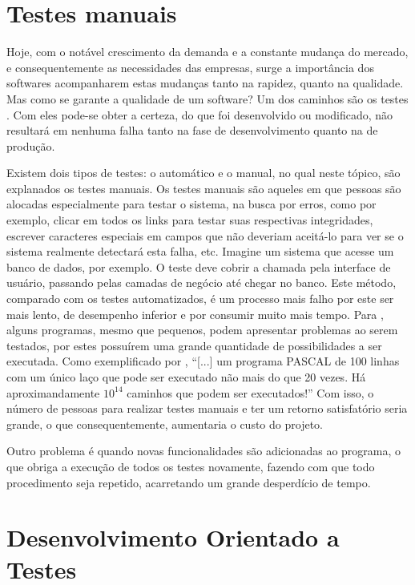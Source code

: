 \section{Testes manuais}

Hoje, com o notável crescimento da demanda e a constante mudança do mercado, e consequentemente as necessidades das empresas, surge a importância dos softwares acompanharem estas mudanças tanto na rapidez, quanto na qualidade. Mas como se garante a qualidade de um software? Um dos caminhos são os testes \cite{PRESSMAN}. Com eles pode-se obter a certeza, do que foi desenvolvido ou modificado, não resultará em nenhuma falha tanto na fase de desenvolvimento quanto na de produção.

Existem dois tipos de testes: o automático e o manual, no qual neste tópico, são explanados os testes manuais. Os testes manuais são aqueles em que pessoas são alocadas especialmente para testar o sistema, na busca por erros, como por exemplo, clicar em todos os links para testar suas respectivas integridades, escrever caracteres especiais em campos que não deveriam aceitá-lo para ver se o sistema realmente detectará esta falha, etc. Imagine um sistema que acesse um banco de dados, por exemplo. O teste deve cobrir a chamada pela interface de usuário, passando pelas camadas de negócio até chegar no banco. Este método, comparado com os testes automatizados, é um processo mais falho por este ser mais lento, de desempenho inferior e por consumir muito mais tempo. Para , alguns programas, mesmo que pequenos, podem apresentar problemas ao serem testados, por estes possuírem uma grande quantidade de possibilidades a ser executada. Como exemplificado por , ``[...] um programa PASCAL de 100 linhas com um único laço que pode ser executado não mais do que 20 vezes. Há aproximandamente $10^{14}$ caminhos que podem ser executados!'' Com isso, o número de pessoas para realizar testes manuais e ter um retorno satisfatório seria grande, o que consequentemente, aumentaria o custo do projeto.

Outro problema é quando novas funcionalidades são adicionadas ao programa, o que obriga a execução de todos os testes novamente, fazendo com que todo procedimento seja repetido, acarretando um grande desperdício de tempo.

\section{Desenvolvimento Orientado a Testes}

